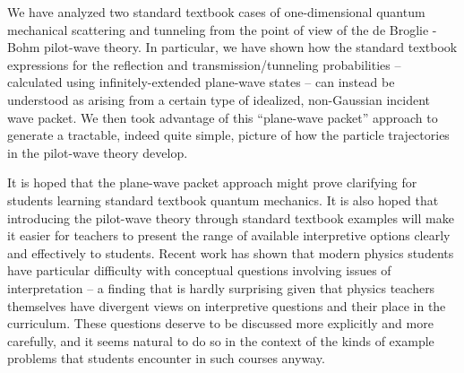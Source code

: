 \documentclass[aps,prc,twocolumn,letterpaper,floatfix]{revtex4}
\begin{document}
We have analyzed two standard textbook cases of one-dimensional
quantum mechanical scattering and tunneling from the point of view of the de
Broglie - Bohm pilot-wave theory.  In particular, we have shown how
the standard textbook expressions for the reflection and
transmission/tunneling probabilities -- calculated using
infinitely-extended plane-wave states -- can instead be understood as arising
from a certain type of idealized, non-Gaussian incident wave packet.  We then
took advantage of this ``plane-wave packet'' approach to generate a
tractable, indeed quite simple, picture of how the particle
trajectories in the pilot-wave theory develop.  

It is hoped that the plane-wave packet approach might prove
clarifying for students learning standard textbook quantum mechanics.
It is also hoped that introducing the pilot-wave theory
through standard textbook examples will make it easier for teachers to
present the range of available interpretive options clearly and effectively to
students.  Recent work has shown that modern physics students have particular
difficulty with conceptual questions involving issues of
interpretation \cite{wuttiprom} -- a finding that is hardly surprising
given that physics teachers themselves have divergent views on
interpretive questions and their place in the curriculum.
\cite{baily}  These questions deserve to be discussed more explicitly
and more carefully, and it seems natural to do so in the context of
the kinds of example problems that students encounter in such courses
anyway.  
\end{document}
